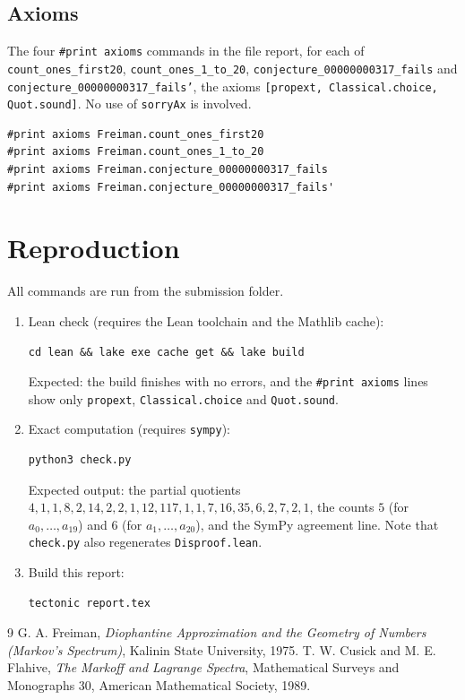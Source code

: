 \documentclass[11pt]{article}
\begin{document}
\subsection{Axioms}

The four \texttt{\#print axioms} commands in the file report, for each of
\texttt{count\_ones\_first20}, \texttt{count\_ones\_1\_to\_20},
\texttt{conjecture\_00000000317\_fails} and \texttt{conjecture\_00000000317\_fails'}, the axioms
\texttt{[propext, Classical.choice, Quot.sound]}. No use of \texttt{sorryAx} is involved.

\begin{lstlisting}
#print axioms Freiman.count_ones_first20
#print axioms Freiman.count_ones_1_to_20
#print axioms Freiman.conjecture_00000000317_fails
#print axioms Freiman.conjecture_00000000317_fails'
\end{lstlisting}

\section{Reproduction}

All commands are run from the submission folder.

\begin{enumerate}
\item Lean check (requires the Lean toolchain and the Mathlib cache):
\begin{lstlisting}
cd lean && lake exe cache get && lake build
\end{lstlisting}
Expected: the build finishes with no errors, and the \texttt{\#print axioms} lines show only
\texttt{propext}, \texttt{Classical.choice} and \texttt{Quot.sound}.

\item Exact computation (requires \texttt{sympy}):
\begin{lstlisting}
python3 check.py
\end{lstlisting}
Expected output: the partial quotients $4, 1, 1, 8, 2, 14, 2, 2, 1, 12, 117, 1, 1, 7, 16, 35, 6, 2, 7, 2, 1$,
the counts $5$ (for $a_0, \dots, a_{19}$) and $6$ (for $a_1, \dots, a_{20}$), and the SymPy agreement
line. Note that \texttt{check.py} also regenerates \texttt{Disproof.lean}.

\item Build this report:
\begin{lstlisting}
tectonic report.tex
\end{lstlisting}
\end{enumerate}

\begin{thebibliography}{9}
 G. A. Freiman, \emph{Diophantine Approximation and the Geometry of Numbers (Markov's Spectrum)}, Kalinin State University, 1975.
 T. W. Cusick and M. E. Flahive, \emph{The Markoff and Lagrange Spectra}, Mathematical Surveys and Monographs 30, American Mathematical Society, 1989.
\end{thebibliography}
\end{document}
